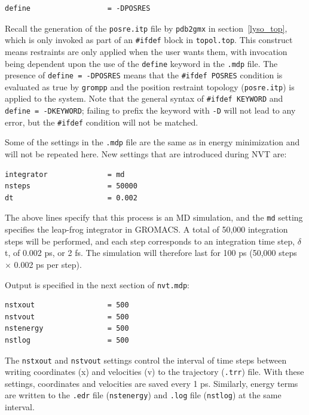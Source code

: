 \documentclass[9pt,tutorial]{livecoms}
\begin{document}
\begin{verbatim}
define                  = -DPOSRES
\end{verbatim}

Recall the generation of the \texttt{posre.itp} file by \texttt{pdb2gmx} in section~\ref{lyso_top}, which is only invoked as part of an \texttt{\#ifdef} block in \texttt{topol.top}. This construct means restraints are only applied when the user wants them, with invocation being dependent upon the use of the \texttt{define} keyword in the \texttt{.mdp} file. The presence of \texttt{define = -DPOSRES} means that the \texttt{\#ifdef POSRES} condition is evaluated as true by \texttt{grompp} and the position restraint topology (\texttt{posre.itp}) is applied to the system. Note that the general syntax of \texttt{\#ifdef KEYWORD} and \texttt{define = -DKEYWORD}; failing to prefix the keyword with \texttt{-D} will not lead to any error, but the \texttt{\#ifdef} condition will not be matched.

Some of the settings in the \texttt{.mdp} file are the same as in energy minimization and will not be repeated here. New settings that are introduced during NVT are:

\begin{verbatim}
integrator              = md
nsteps                  = 50000
dt                      = 0.002
\end{verbatim}

The above lines specify that this process is an MD simulation, and the \texttt{md} setting specifies the leap-frog integrator in GROMACS. A total of 50,000 integration steps will be performed, and each step corresponds to an integration time step, $\delta$t, of 0.002 ps, or 2 fs. The simulation will therefore last for 100 ps (50,000 steps $\times$ 0.002 ps per step).

Output is specified in the next section of \texttt{nvt.mdp}:

\begin{verbatim}
nstxout                 = 500
nstvout                 = 500
nstenergy               = 500
nstlog                  = 500
\end{verbatim}

The \texttt{nstxout} and \texttt{nstvout} settings control the interval of time steps between writing coordinates (x) and velocities (v) to the trajectory (\texttt{.trr}) file. With these settings, coordinates and velocities are saved every 1 ps. Similarly, energy terms are written to the \texttt{.edr} file (\texttt{nstenergy}) and \texttt{.log} file (\texttt{nstlog}) at the same interval.
\end{document}
